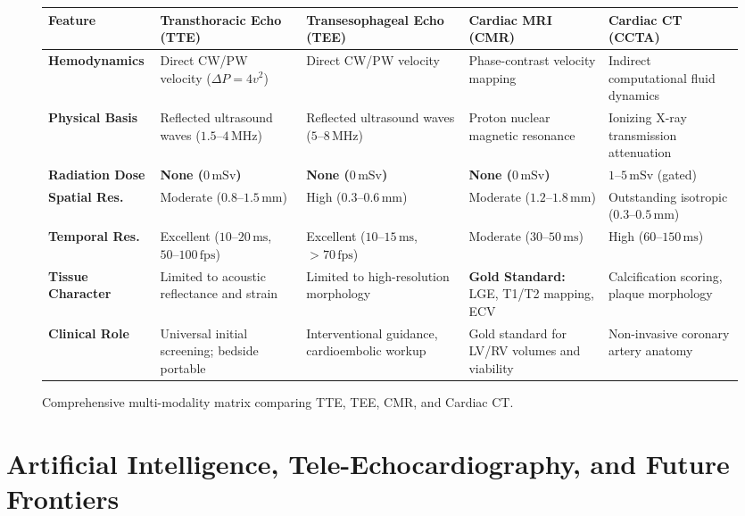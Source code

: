 \documentclass[11pt,a4paper]{article}
\begin{document}
\begin{figure}[htbp]
\centering
\small
\setlength{\tabcolsep}{3pt}
\begin{tabular}{p{2.7cm}p{2.9cm}p{2.9cm}p{3.1cm}p{2.9cm}}
\toprule
\textbf{Feature} & \textbf{Transthoracic Echo (TTE)} & \textbf{Transesophageal Echo (TEE)} & \textbf{Cardiac MRI (CMR)} & \textbf{Cardiac CT (CCTA)} \\
\midrule
\textbf{Hemodynamics} & Direct CW/PW velocity ($\Delta P = 4v^2$) & Direct CW/PW velocity & Phase-contrast velocity mapping & Indirect computational fluid dynamics \\
\addlinespace
\textbf{Physical Basis} & Reflected ultrasound waves ($1.5\text{--}4\,\text{MHz}$) & Reflected ultrasound waves ($5\text{--}8\,\text{MHz}$) & Proton nuclear magnetic resonance & Ionizing X-ray transmission attenuation \\
\addlinespace
\textbf{Radiation Dose} & \textbf{None ($0\,\text{mSv}$)} & \textbf{None ($0\,\text{mSv}$)} & \textbf{None ($0\,\text{mSv}$)} & $1\text{--}5\,\text{mSv}$ (gated) \\
\addlinespace
\textbf{Spatial Res.} & Moderate ($0.8\text{--}1.5\,\text{mm}$) & High ($0.3\text{--}0.6\,\text{mm}$) & Moderate ($1.2\text{--}1.8\,\text{mm}$) & Outstanding isotropic ($0.3\text{--}0.5\,\text{mm}$) \\
\addlinespace
\textbf{Temporal Res.} & Excellent ($10\text{--}20\,\text{ms}$, $50\text{--}100\,\text{fps}$) & Excellent ($10\text{--}15\,\text{ms}$, $> 70\,\text{fps}$) & Moderate ($30\text{--}50\,\text{ms}$) & High ($60\text{--}150\,\text{ms}$) \\
\addlinespace
\textbf{Tissue Character} & Limited to acoustic reflectance and strain & Limited to high-resolution morphology & \textbf{Gold Standard:} LGE, T1/T2 mapping, ECV & Calcification scoring, plaque morphology \\
\addlinespace
\textbf{Clinical Role} & Universal initial screening; bedside portable & Interventional guidance, cardioembolic workup & Gold standard for LV/RV volumes and viability & Non-invasive coronary artery anatomy \\
\bottomrule
\end{tabular}
\caption{Comprehensive multi-modality matrix comparing TTE, TEE, CMR, and Cardiac CT.}
\label{tab:multimodality_comparison}
\end{figure}

\section{Artificial Intelligence, Tele-Echocardiography, and Future Frontiers}
\end{document}

